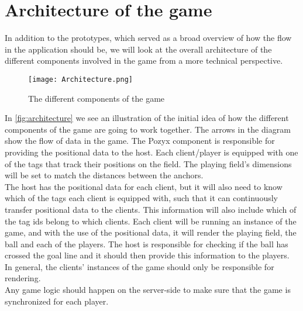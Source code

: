 \section{Architecture of the game}\label{sec:sprint1-architecture}
In addition to the prototypes, which served as a broad overview of how the flow in the application should be, we will look at the overall architecture of the different components involved in the game from a more technical perspective.
\begin{figure}[H]
    \centering
    \texttt{[image: Architecture.png]}
    \caption{The different components of the game}
    \label{fig:architecture}
\end{figure}
\noindent
In \autoref{fig:architecture} we see an illustration of the initial idea of how the different components of the game are going to work together.
The arrows in the diagram show the flow of data in the game.
The Pozyx component is responsible for providing the positional data to the host.
Each client/player is equipped with one of the tags that track their positions on the field. 
The playing field's dimensions will be set to match the distances between the anchors. \\
The host has the positional data for each client, but it will also need to know which of the tags each client is equipped with, such that it can continuously transfer positional data to the clients.
This information will also include which of the tag ids belong to which clients.
Each client will be running an instance of the game, and with the use of the positional data, it will render the playing field, the ball and each of the players.
The host is responsible for checking if the ball has crossed the goal line and it should then provide this information to the players.
In general, the clients' instances of the game should only be responsible for rendering. \\
Any game logic should happen on the server-side to make sure that the game is synchronized for each player. 

